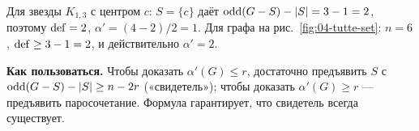 \begin{example}
Для звезды \(K_{1,3}\) с центром \(c\): \(S=\{c\}\) даёт \(\operatorname{odd}(G-S)-|S|=3-1=2\),
поэтому \(\operatorname{def}=2\), \(\alpha'=(4-2)/2=1\). Для графа на рис.~\ref{fig:04-tutte-set}:
\(n=6\), \(\operatorname{def}\ge3-1=2\), и действительно \(\alpha'=2\).
\end{example}
\begin{tcolorbox}[colback=cbGrayBack,colframe=cbGray!55]
\textbf{Как пользоваться.} Чтобы доказать \(\alpha'(G)\le r\), достаточно предъявить
\(S\) с \(\operatorname{odd}(G-S)-|S|\ge n-2r\) («свидетель»); чтобы доказать \(\alpha'(G)\ge r\) —
предъявить паросочетание. Формула гарантирует, что свидетель всегда существует.
\end{tcolorbox}
